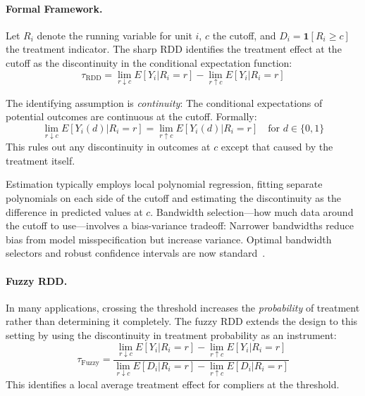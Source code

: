\paragraph{Formal Framework.}
Let $R_i$ denote the running variable for unit $i$, $c$ the cutoff, and $D_i = \mathbf{1}[R_i \geq c]$ the treatment indicator.
The sharp RDD identifies the treatment effect at the cutoff as the discontinuity in the conditional expectation function:
\begin{equation}
    \tau_{\text{RDD}} = \lim_{r \downarrow c} E[Y_i | R_i = r] - \lim_{r \uparrow c} E[Y_i | R_i = r]
\end{equation}

The identifying assumption is \emph{continuity}: The conditional expectations of potential outcomes are continuous at the cutoff.
Formally:
\begin{equation}
    \lim_{r \downarrow c} E[Y_i(d) | R_i = r] = \lim_{r \uparrow c} E[Y_i(d) | R_i = r] \quad \text{for } d \in \{0, 1\}
\end{equation}
This rules out any discontinuity in outcomes at $c$ except that caused by the treatment itself.

Estimation typically employs local polynomial regression, fitting separate polynomials on each side of the cutoff and estimating the discontinuity as the difference in predicted values at $c$.
Bandwidth selection---how much data around the cutoff to use---involves a bias-variance tradeoff: Narrower bandwidths reduce bias from model misspecification but increase variance.
Optimal bandwidth selectors and robust confidence intervals are now standard~\cite{calonico2014robust}.

\paragraph{Fuzzy RDD.}
In many applications, crossing the threshold increases the \emph{probability} of treatment rather than determining it completely.
The fuzzy RDD extends the design to this setting by using the discontinuity in treatment probability as an instrument:
\begin{equation}
    \tau_{\text{Fuzzy}} = \frac{\lim_{r \downarrow c} E[Y_i | R_i = r] - \lim_{r \uparrow c} E[Y_i | R_i = r]}{\lim_{r \downarrow c} E[D_i | R_i = r] - \lim_{r \uparrow c} E[D_i | R_i = r]}
\end{equation}
This identifies a local average treatment effect for compliers at the threshold.

